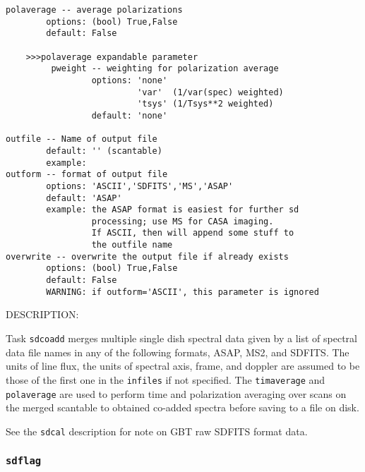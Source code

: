 \begin{verbatim}
polaverage -- average polarizations
        options: (bool) True,False
        default: False

    >>>polaverage expandable parameter
         pweight -- weighting for polarization average
                 options: 'none'
                          'var'  (1/var(spec) weighted)
                          'tsys' (1/Tsys**2 weighted)
                 default: 'none'

outfile -- Name of output file
        default: '' (scantable)
        example:
outform -- format of output file
        options: 'ASCII','SDFITS','MS','ASAP'
        default: 'ASAP'
        example: the ASAP format is easiest for further sd
                 processing; use MS for CASA imaging.
                 If ASCII, then will append some stuff to
                 the outfile name
overwrite -- overwrite the output file if already exists
        options: (bool) True,False
        default: False
        WARNING: if outform='ASCII', this parameter is ignored 
\end{verbatim}

DESCRIPTION:

Task {\tt sdcoadd} merges multiple single dish spectral data given by
a list of spectral data file names in any of the following formats,
ASAP, MS2, and SDFITS.
The units of line flux, the units of spectral axis, frame, and doppler
are assumed to be those of the first one in the {\tt infiles} if not
specified.
The {\tt timaverage} and {\tt polaverage} are used to perform time
and polarization averaging over scans on the merged scantable to 
obtained co-added spectra before saving to a file on disk.

See the {\tt sdcal} description for note on GBT raw SDFITS format data.


\subsubsection{{\tt sdflag}}
\label{section:sd.sdtasks.tasks.sdflag}

